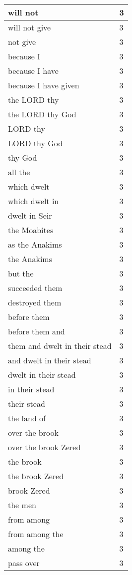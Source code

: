 \begin{center}
\begin{longtable}{|p{3.0in}|p{0.5in}|}
will not & 3\\ \hline 
will not give & 3\\ \hline 
not give & 3\\ \hline 
because I & 3\\ \hline 
because I have & 3\\ \hline 
because I have given & 3\\ \hline 
the LORD thy & 3\\ \hline 
the LORD thy God & 3\\ \hline 
LORD thy & 3\\ \hline 
LORD thy God & 3\\ \hline 
thy God & 3\\ \hline 
all the & 3\\ \hline 
which dwelt & 3\\ \hline 
which dwelt in & 3\\ \hline 
dwelt in Seir & 3\\ \hline 
the Moabites & 3\\ \hline 
as the Anakims & 3\\ \hline 
the Anakims & 3\\ \hline 
but the & 3\\ \hline 
succeeded them & 3\\ \hline 
destroyed them & 3\\ \hline 
before them & 3\\ \hline 
before them and & 3\\ \hline 
them and dwelt in their stead & 3\\ \hline 
and dwelt in their stead & 3\\ \hline 
dwelt in their stead & 3\\ \hline 
in their stead & 3\\ \hline 
their stead & 3\\ \hline 
the land of & 3\\ \hline 
over the brook & 3\\ \hline 
over the brook Zered & 3\\ \hline 
the brook & 3\\ \hline 
the brook Zered & 3\\ \hline 
brook Zered & 3\\ \hline 
the men & 3\\ \hline 
from among & 3\\ \hline 
from among the & 3\\ \hline 
among the & 3\\ \hline 
pass over & 3\\ \hline 

\end{longtable}
\end{center}
